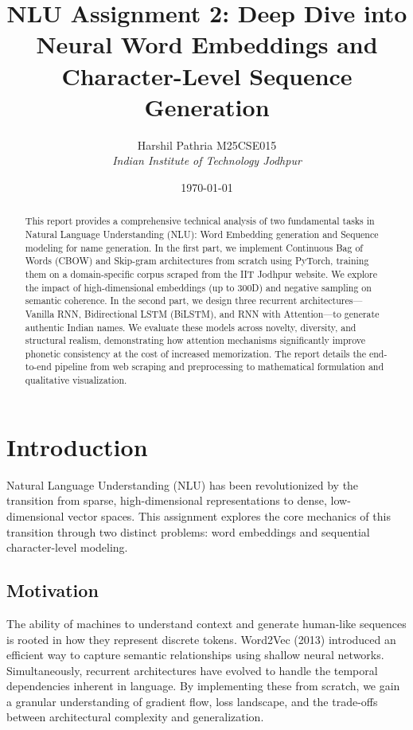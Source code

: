 \documentclass[12pt,a4paper]{article}
\title{\textbf{NLU Assignment 2: Deep Dive into Neural Word Embeddings and Character-Level Sequence Generation}}
\author{Harshil Pathria M25CSE015 \\ \textit{Indian Institute of Technology Jodhpur}}
\date{\today}
\begin{document}
\maketitle

\begin{abstract}
This report provides a comprehensive technical analysis of two fundamental tasks in Natural Language Understanding (NLU): Word Embedding generation and Sequence modeling for name generation. In the first part, we implement Continuous Bag of Words (CBOW) and Skip-gram architectures from scratch using PyTorch, training them on a domain-specific corpus scraped from the IIT Jodhpur website. We explore the impact of high-dimensional embeddings (up to 300D) and negative sampling on semantic coherence. In the second part, we design three recurrent architectures—Vanilla RNN, Bidirectional LSTM (BiLSTM), and RNN with Attention—to generate authentic Indian names. We evaluate these models across novelty, diversity, and structural realism, demonstrating how attention mechanisms significantly improve phonetic consistency at the cost of increased memorization. The report details the end-to-end pipeline from web scraping and preprocessing to mathematical formulation and qualitative visualization.
\end{abstract}

\newpage
\tableofcontents
\listoffigures
\listoftables
\newpage

\section{Introduction}
Natural Language Understanding (NLU) has been revolutionized by the transition from sparse, high-dimensional representations to dense, low-dimensional vector spaces. This assignment explores the core mechanics of this transition through two distinct problems: word embeddings and sequential character-level modeling.

\subsection{Motivation}
The ability of machines to understand context and generate human-like sequences is rooted in how they represent discrete tokens. Word2Vec (2013) introduced an efficient way to capture semantic relationships using shallow neural networks. Simultaneously, recurrent architectures have evolved to handle the temporal dependencies inherent in language. By implementing these from scratch, we gain a granular understanding of gradient flow, loss landscape, and the trade-offs between architectural complexity and generalization.
\end{document}
